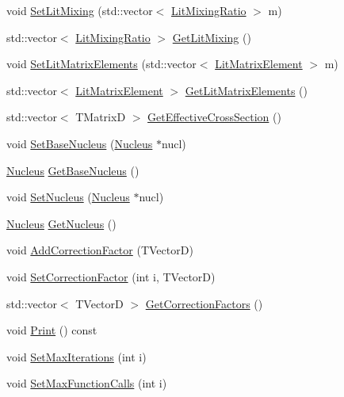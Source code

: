 \begin{DoxyCompactItemize}
\item 
void \hyperlink{classCoulExFitter_a67e04682849c9234aa200006aa614f1a}{Set\-Lit\-Mixing} (std\-::vector$<$ \hyperlink{classLitMixingRatio}{Lit\-Mixing\-Ratio} $>$ m)
\item 
std\-::vector$<$ \hyperlink{classLitMixingRatio}{Lit\-Mixing\-Ratio} $>$ \hyperlink{classCoulExFitter_a7858f449e50acd52a3600e774ea06f89}{Get\-Lit\-Mixing} ()
\item 
void \hyperlink{classCoulExFitter_add6b966bceb96c1e45501147bf51e1d8}{Set\-Lit\-Matrix\-Elements} (std\-::vector$<$ \hyperlink{classLitMatrixElement}{Lit\-Matrix\-Element} $>$ m)
\item 
std\-::vector$<$ \hyperlink{classLitMatrixElement}{Lit\-Matrix\-Element} $>$ \hyperlink{classCoulExFitter_acc3fd4d7bf2a0a85a6524869077704b4}{Get\-Lit\-Matrix\-Elements} ()
\item 
std\-::vector$<$ T\-Matrix\-D $>$ \hyperlink{classCoulExFitter_ac7290cf5ca6893275050ef26161b2832}{Get\-Effective\-Cross\-Section} ()
\item 
void \hyperlink{classCoulExFitter_a1c7724db2db1fd9c41e7daf28cbf5271}{Set\-Base\-Nucleus} (\hyperlink{classNucleus}{Nucleus} $\ast$nucl)
\item 
\hyperlink{classNucleus}{Nucleus} \hyperlink{classCoulExFitter_a70183f69951d7277f9b183f820210971}{Get\-Base\-Nucleus} ()
\item 
void \hyperlink{classCoulExFitter_a099e738fd3b6b62355db787c8268cd15}{Set\-Nucleus} (\hyperlink{classNucleus}{Nucleus} $\ast$nucl)
\item 
\hyperlink{classNucleus}{Nucleus} \hyperlink{classCoulExFitter_a0c587c7748683456fd558bad426c1fe1}{Get\-Nucleus} ()
\item 
void \hyperlink{classCoulExFitter_acd5ed89489dfbb4ec2a480d5ae933b04}{Add\-Correction\-Factor} (T\-Vector\-D)
\item 
void \hyperlink{classCoulExFitter_aec7d01311ac98f4e6a909cc76ee79a1a}{Set\-Correction\-Factor} (int i, T\-Vector\-D)
\item 
std\-::vector$<$ T\-Vector\-D $>$ \hyperlink{classCoulExFitter_ac99895ede79f2918b619f1def61ee768}{Get\-Correction\-Factors} ()
\item 
void \hyperlink{classCoulExFitter_a92e5a9e3b4fbbf8d3df93543d2bf00c5}{Print} () const 
\item 
void \hyperlink{classCoulExFitter_af64c86ac6a7c93c8bc5cbe45f072afb3}{Set\-Max\-Iterations} (int i)
\item 
void \hyperlink{classCoulExFitter_aa4176694fecb8647bf90443c0be564d4}{Set\-Max\-Function\-Calls} (int i)

\end{DoxyCompactItemize}
